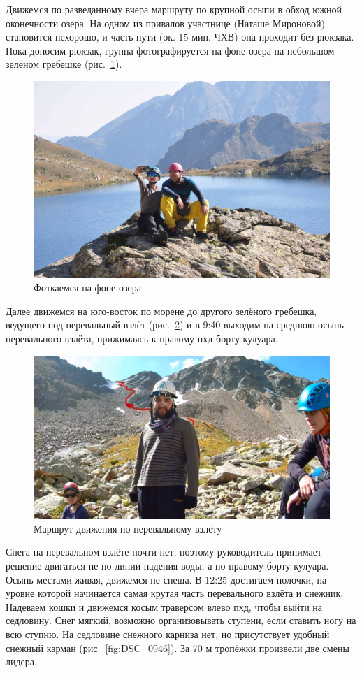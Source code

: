  Движемся по разведанному вчера маршруту по крупной осыпи в обход южной оконечности озера. На одном из привалов участнице (Наташе Мироновой) становится нехорошо, и часть пути (ок. 15 мин. ЧХВ) она проходит без рюкзака. Пока доносим рюкзак, группа фотографируется на фоне озера на небольшом зелёном гребешке (рис.~\ref{fig:DSC_0907}).
 
 \begin{figure}[h!]
 	\centering
 	\includegraphics[width=0.7\linewidth]{../pics/DSC_0907}
 	\caption{Фоткаемся на фоне озера}
 	\label{fig:DSC_0907}
 \end{figure}
 

Далее движемся на юго-восток по морене до другого зелёного гребешка, ведущего под перевальный взлёт (рис.~\ref{fig:20aug2.jpg}) и в 9:40 выходим на среднюю осыпь перевального взлёта, прижимаясь к правому пхд борту кулуара.

\begin{figure}[h!]
	\centering
	\includegraphics[width=0.7\linewidth]{../pics/20aug2.jpg}
	\caption{Маршрут движения по перевальному взлёту}
	\label{fig:20aug2.jpg}
\end{figure}

Снега на перевальном взлёте почти нет, поэтому руководитель принимает решение двигаться не по линии падения воды, а по правому борту кулуара. Осыпь местами живая, движемся не спеша. В 12:25 достигаем полочки, на уровне которой начинается самая крутая часть перевального взлёта и снежник. Надеваем кошки и движемся косым траверсом влево пхд, чтобы выйти на седловину. Снег мягкий, возможно организовывать ступени, если ставить ногу на всю ступню. На седловине снежного карниза нет, но присутствует удобный снежный карман (рис.~\ref{fig:DSC_0946}). За 70 м тропёжки произвели две смены лидера.

